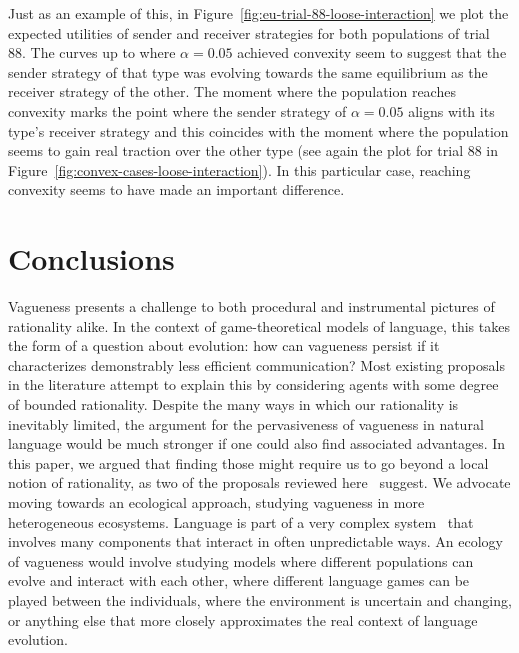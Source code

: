 \documentclass[a4paper]{article}
\begin{document}
Just as an example of this, in Figure~\ref{fig:eu-trial-88-loose-interaction} we plot the expected utilities of sender and receiver strategies for both populations of trial 88.
The curves up to where $\alpha = 0.05$ achieved convexity seem to suggest that the sender strategy of that type was evolving towards the same equilibrium as the receiver strategy of the other.
The moment where the population reaches convexity marks the point where the sender strategy of $\alpha = 0.05$ aligns with its type's receiver strategy and this coincides with the moment where the population seems to gain real traction over the other type (see again the plot for trial 88 in Figure~\ref{fig:convex-cases-loose-interaction}).
In this particular case, reaching convexity seems to have made an important difference.


\section{Conclusions}
\label{sec:conclusions}
Vagueness presents a challenge to both procedural and instrumental pictures of rationality alike.
In the context of game-theoretical models of language, this takes the form of a question about evolution: how can vagueness persist if it characterizes demonstrably less efficient communication?
Most existing proposals in the literature attempt to explain this by considering agents with some degree of bounded rationality.
Despite the many ways in which our rationality is inevitably limited, the argument for the pervasiveness of vagueness in natural language would be much stronger if one could also find associated advantages.
In this paper, we argued that finding those might require us to go beyond a local notion of rationality, as two of the proposals reviewed here~\parencite{oconnor_evolution_2014, franke_vagueness_2017} suggest.
We advocate moving towards an ecological approach, studying vagueness in more heterogeneous ecosystems.
Language is part of a very complex system~\parencite{beckner_language_2009} that involves many components that interact in often unpredictable ways.
An ecology of vagueness would involve studying models where different populations can evolve and interact with each other, where different language games can be played between the individuals, where the environment is uncertain and changing, or anything else that more closely approximates the real context of language evolution.
\end{document}
